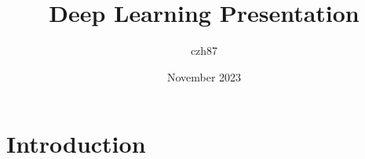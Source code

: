 \documentclass{article}
\title{Deep Learning Presentation}
\author{czh87 }
\date{November 2023}
\begin{document}
\maketitle

\section{Introduction}
\end{document}
